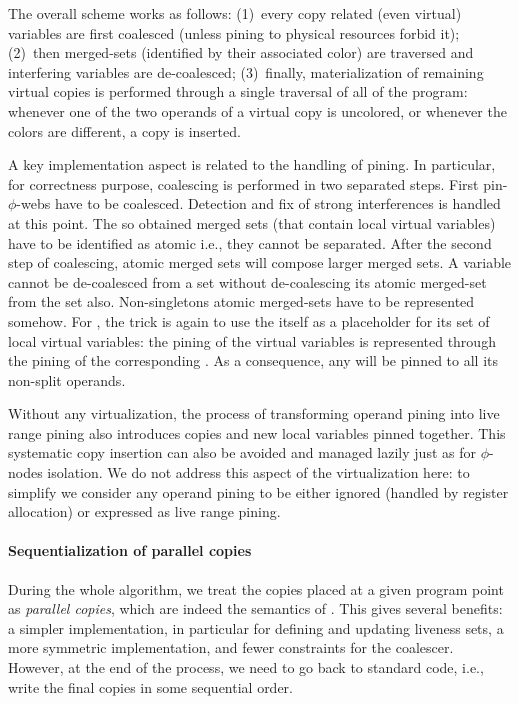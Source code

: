         
The overall scheme works as follows: 
(1)~every copy related (even virtual) variables are first coalesced (unless pining to physical resources forbid it); 
(2)~then merged-sets (identified by their associated color) are traversed and interfering variables are de-coalesced; 
(3)~finally, materialization of remaining virtual copies is performed through a single traversal of all \phifuns of the program: 
whenever one of the two operands of a virtual copy is uncolored, or whenever the colors are different, a copy is inserted.

A key implementation aspect is related to the handling of pining. 
In particular, for correctness purpose, coalescing is performed in two separated steps. 
First pin-$\phi$-webs have to be coalesced. 
Detection and fix of strong interferences is handled at this point. 
The so obtained merged sets (that contain local virtual variables) have to be identified as atomic i.e., they cannot be separated. 
After the second step of coalescing, atomic merged sets will compose larger merged sets. 
A variable cannot be de-coalesced from a set without de-coalescing its atomic merged-set from the set also. 
Non-singletons atomic merged-sets have to be represented somehow. 
For \phifuns, the trick is again to use the \phifun itself as a placeholder for its set of local virtual variables: 
the pining of the virtual variables is represented through the pining of the corresponding \phifun. 
As a consequence, any \phifun will be pinned to all its non-split operands.

Without any virtualization, the process of transforming operand pining into live range pining also introduces copies and new local variables pinned together. 
This systematic copy insertion can also be avoided and managed lazily just as for $\phi$-nodes isolation. 
We do not address this aspect of the virtualization here: 
to simplify we consider any operand pining to be either ignored (handled by register allocation) or expressed as live range pining.





\paragraph{Sequentialization of parallel copies}          
During the whole algorithm, we treat the copies placed at a given program point as \emph{parallel copies}, which are indeed the semantics of \phifuns. 
This gives several benefits: 
a simpler implementation, in particular for defining and updating liveness sets, a more symmetric implementation, and fewer constraints for the coalescer. 
However, at the end of the process, we need to go back to standard code, i.e., write the final copies in some sequential order.

